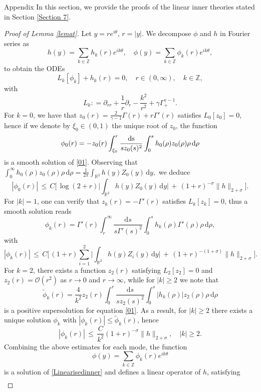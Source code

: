 \documentclass[11pt,reqno,a4paper]{amsart}
\numberwithin{equation}{section}
\def\dd{{\mathrm{d}}}
\newcommand{\R}{\mathbb{R}}
\newcommand{\Z}{\mathbb{Z}}
\newcommand{\defeq}{\mathrel{\mathop:}=}
\begin{document}
\begin{section}{Appendix}
In this section, we provide the proofs of the linear inner theories stated in Section \ref{Section 7}. 
\begin{proof}[Proof of Lemma \ref{lemat}]
Let $y=re^{i\theta}, \, r=|y|$. We decompose $\phi$ and $h$ in Fourier series as 
$$ h(y) =  \sum_{k\in\Z}  h_k (r) e^{ik\theta} , \quad \phi(y)= \sum_{k\in\Z}\phi_{k} (r) e^{ik\theta},
$$
to obtain the ODEs  
\begin{equation}\label{01}
L_k [\phi_{k}] + h_k(r) = 0 , \quad r\in(0,\infty), \quad k \in \Z,
\end{equation}
with
$$
L_k\defeq \partial_{rr} + \frac 1r \partial_{r}- \frac{k^2}{r^2}+  \gamma\Gamma^{\gamma-1}_{+}  .
$$
For $k=0$, we have that $z_0(r) = \frac{2}{ \gamma-1}\Gamma(r)+r\Gamma'(r)$ satisfies $L_0[z_0]=0,$ hence if we denote by $\xi_0\in(0,1)$ the unique root of $z_{0}$, the function
$$
\phi_{0} (r) =     -z_0(r)\int_{\xi_0}^r  \frac {\rm d s}{ s z_0(s)^2}  \int_0^s h_0(\rho) z_0(\rho) \rho\, \dd \rho
$$
is a smooth solution of \eqref{01}. Observing that $\int_0^\infty h_0(\rho) z_0(\rho) \rho\, \dd\rho = \frac 1{2\pi}\int_{\R^2} h(y)Z_0(y)\, \dd y,$
we deduce  
$$
|\phi_{0}(r)| \, \le \,   C\Big[ \, \log (2 + r) \Big| \int_{\R^2} h(y)Z_0(y)\, \dd y      \Big|   \, +\,  (1+r)^{-\sigma} \|h\|_{2+ \sigma} \Big ].
$$
For $|k|=1$, one can verify that  $z_k(r)=-\Gamma'(r)$ satisfies $L_k[z_k]=0$, thus a smooth solution reads
$$
\phi_{k}  (r) =     \Gamma'(r)\int_r^\infty  \frac {\dd s}{ s\Gamma'(s)^2}  \int_0^s h_k(\rho) \Gamma'(\rho) \rho\, \dd\rho,
$$
with
$$
|\phi_{k}(r)| \, \le \,   C\Big[ \,  (1+ r) \sum_{i=1}^2 \Big| \int_{\R^2} h(y)Z_i(y)\, \dd y      \Big|   \, +\,  (1+r)^{-(1+\sigma)} \|h\|_{ 2+\sigma} \Big ].
$$
For $k=2$, there exists a function $z_2(r)$ satisfying $ L_2[z_2] = 0 $ and  $z_2(r)=\mathcal{O}(r^{2})$ as $r\to 0$ and $r\to \infty$, while for $|k|\ge 2$ we note that
$$
\widetilde\phi_{k}  (r) =   \frac 4{ k^2} z_2(r)\int_0^r  \frac {\dd s}{ s z_2(s)^2}  \int_0^s |h_k(\rho)| z_2(\rho) \rho\,\dd \rho
$$
is a positive supersolution for equation \eqref{01}. As a result, for $|k|\geq 2$ there exists a unique solution $\phi_{k}$  with $|\phi_{k}(r)| \le \widetilde\phi_{k}  (r)$, hence
$$
|\phi_{k}(r)| \, \le \,    \frac C {k^2}   (1+r)^{-\sigma} \|h\|_{2+\sigma}, \quad |k|\ge 2.
$$
Combining the above estimates for each mode, the function  $$\phi(y)= \sum_{k\in\Z} \phi_{k} (r) e^{ik\theta} $$  is a solution of \eqref{Linearisedinner} and defines a linear operator of $h$, satisfying 
\begin{equation}\label{cot} \begin{aligned}

\end{aligned}
\end{equation}
\end{proof}
\end{section}
\end{document}
